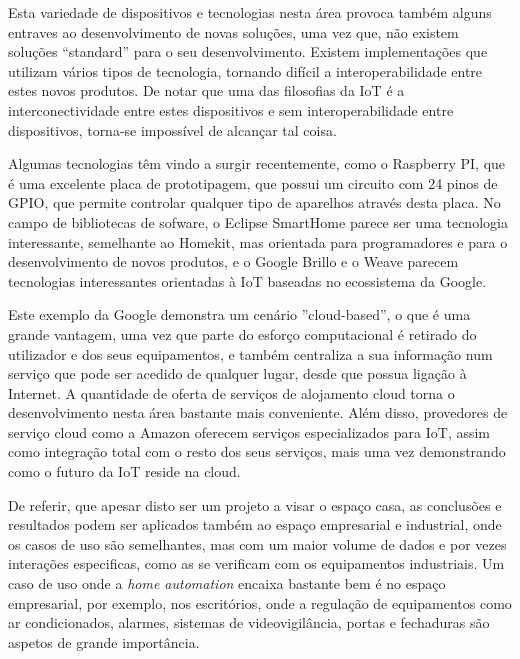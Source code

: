 Esta variedade de dispositivos e tecnologias nesta área provoca também alguns entraves ao desenvolvimento de novas soluções, uma vez que, não existem soluções “standard” para o seu desenvolvimento. Existem implementações que utilizam vários tipos de tecnologia, tornando difícil a interoperabilidade entre estes novos produtos. De notar que uma das filosofias da IoT é a interconectividade entre estes dispositivos e sem interoperabilidade entre dispositivos, torna-se impossível de alcançar tal coisa.

Algumas tecnologias têm vindo a surgir recentemente, como o Raspberry PI, que é uma excelente placa de prototipagem, que possui um circuito com 24 pinos de GPIO, que permite controlar qualquer tipo de aparelhos através desta placa. No campo de bibliotecas de sofware, o Eclipse SmartHome parece ser uma tecnologia interessante, semelhante ao Homekit, mas orientada para programadores e para o desenvolvimento de novos produtos, e o Google Brillo e o Weave parecem tecnologias interessantes orientadas à IoT baseadas no ecossistema da Google.

Este exemplo da Google demonstra um cenário ''cloud-based'', o que é uma grande vantagem, uma vez que parte do esforço computacional é retirado do utilizador e dos seus equipamentos, e também centraliza a sua informação num serviço que pode ser acedido de qualquer lugar, desde que possua ligação à Internet. A quantidade de oferta de serviços de alojamento cloud torna o desenvolvimento nesta área bastante mais conveniente. Além disso, provedores de serviço cloud como a Amazon oferecem serviços especializados para IoT, assim como integração total com o resto dos seus serviços, mais uma vez demonstrando como o futuro da IoT reside na cloud.

De referir, que apesar disto ser um projeto a visar o espaço casa, as conclusões e resultados podem ser aplicados também ao espaço empresarial e industrial, onde os casos de uso são semelhantes, mas com um maior volume de dados e por vezes interações especificas, como as se verificam com os equipamentos industriais. Um caso de uso onde a \textit{home automation} encaixa bastante bem é no espaço empresarial, por exemplo, nos escritórios, onde a regulação de equipamentos como ar condicionados, alarmes, sistemas de videovigilância, portas e fechaduras são aspetos de grande importância.